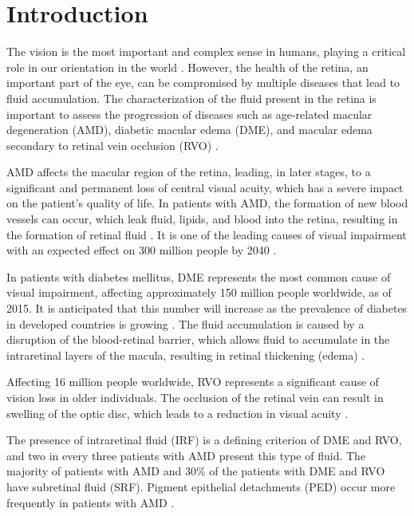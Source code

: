 \chapter{Introduction}
The vision is the most important and complex sense in humans, playing a critical role in our orientation in the world \parencite{Hutmacher2019}. However, the health of the retina, an important part of the eye, can be compromised by multiple diseases that lead to fluid accumulation. The characterization of the fluid present in the retina is important to assess the progression of diseases such as age-related macular degeneration (AMD), diabetic macular edema (DME), and macular edema secondary to retinal vein occlusion (RVO) \parencite{Bogunovic2019a}.
\par
AMD affects the macular region of the retina, leading, in later stages, to a significant and permanent loss of central visual acuity, which has a severe impact on the patient's quality of life. In patients with AMD, the formation of new blood vessels can occur, which leak fluid, lipids, and blood into the retina, resulting in the formation of retinal fluid \parencite{Lim2012}. It is one of the leading causes of visual impairment with an expected effect on 300 million people by 2040 \parencite{Mitchell2018}.
\par
In patients with diabetes mellitus, DME represents the most common cause of visual impairment, affecting approximately 150 million people worldwide, as of 2015. It is anticipated that this number will increase as the prevalence of diabetes in developed countries is growing \parencite{Musat2015}. The fluid accumulation is caused by a disruption of the blood-retinal barrier, which allows fluid to accumulate in the intraretinal layers of the macula, resulting in retinal thickening (edema) \parencite{Bhagat2009, Bandello2019}.
\par
Affecting 16 million people worldwide, RVO represents a significant cause of vision loss in older individuals. The occlusion of the retinal vein can result in swelling of the optic disc, which leads to a reduction in visual acuity \parencite{Wong2010}. 
\par
The presence of intraretinal fluid (IRF) is a defining criterion of DME and RVO, and two in every three patients with AMD present this type of fluid. The majority of patients with AMD and 30\% of the patients with DME and RVO have subretinal fluid (SRF). Pigment epithelial detachments (PED) occur more frequently in patients with AMD \parencite{Bogunovic2019a}.
\par
